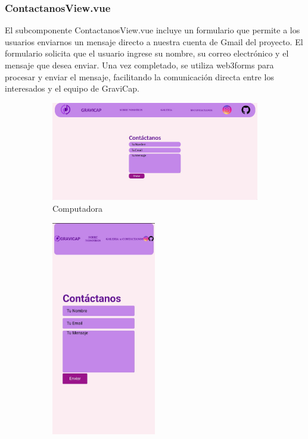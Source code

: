                 \subsubsection{ContactanosView.vue}
                    El subcomponente ContactanosView.vue incluye un formulario que permite a los usuarios enviarnos un mensaje directo a nuestra cuenta de Gmail del proyecto. El formulario solicita que el usuario ingrese su nombre, su correo electrónico y el mensaje que desea enviar. Una vez completado, se utiliza web3forms para procesar y enviar el mensaje, facilitando la comunicación directa entre los interesados y el equipo de \textcolor{dark_violet}{GraviCap}.\par

                    \begin{figure} [H]
                    \centering
                    \begin{subfigure}{0.5\textwidth}
                        \centering
                        \includegraphics[width=\textwidth]{Página Web/Computadora/Contactos.png}
                        \caption{Computadora}
                        \label{fig:pw5.1}
                    \end{subfigure}
                    \begin{subfigure}{0.4\textwidth}
                        \centering
                        \includegraphics[width=0.5\textwidth]{Página Web/Celular/Contactos.png}

\end{subfigure}
\end{figure}
